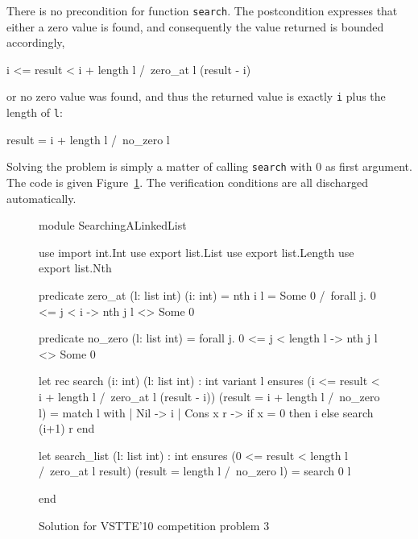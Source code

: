 There is no precondition for function \texttt{search}.
The postcondition expresses that either a zero value is found, and
consequently the value returned is bounded accordingly,
\begin{whycode}
  i <= result < i + length l /\ zero_at l (result - i)
\end{whycode}
or no zero value was found, and thus the returned value is exactly
\texttt{i} plus the length of \texttt{l}:
\begin{whycode}
  result = i + length l /\ no_zero l
\end{whycode}
Solving the problem is simply a matter of calling \texttt{search} with
0 as first argument.
The code is given Figure~\ref{fig:LinkedList}.
The verification conditions are all discharged automatically.
\begin{figure}
  \centering
\begin{whycode}
module SearchingALinkedList

  use import int.Int
  use export list.List
  use export list.Length
  use export list.Nth

  predicate zero_at (l: list int) (i: int) =
    nth i l = Some 0 /\ forall j. 0 <= j < i -> nth j l <> Some 0

  predicate no_zero (l: list int) =
    forall j. 0 <= j < length l -> nth j l <> Some 0

  let rec search (i: int) (l: list int) : int variant { l }
    ensures { (i <= result < i + length l /\ zero_at l (result - i))
           \/ (result = i + length l /\ no_zero l) }
  = match l with
    | Nil -> i
    | Cons x r -> if x = 0 then i else search (i+1) r
    end

  let search_list (l: list int) : int
    ensures { (0 <= result < length l /\ zero_at l result)
           \/ (result = length l /\ no_zero l) }
  = search 0 l

end
\end{whycode}
\vspace*{-1em}%
  \caption{Solution for VSTTE'10 competition problem 3}
  \label{fig:LinkedList}
\end{figure}

